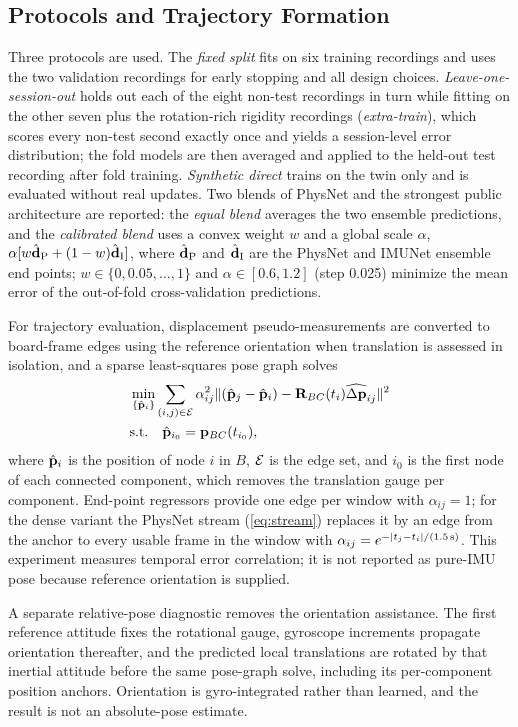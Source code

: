 \subsection{Protocols and Trajectory Formation}
Three protocols are used. The \emph{fixed split} fits on six training
recordings and uses the two validation recordings for early stopping and all
design choices. \emph{Leave-one-session-out} holds out each of the eight
non-test recordings in turn while fitting on the other seven plus the
rotation-rich rigidity recordings (\emph{extra-train}), which scores every
non-test second exactly once and yields a session-level error distribution;
the fold models are then averaged and applied to the held-out test
recording after fold training. \emph{Synthetic direct} trains on the twin only and is evaluated
without real updates. Two blends of PhysNet and the strongest public
architecture are reported: the \emph{equal blend} averages the two ensemble
predictions, and the \emph{calibrated blend} uses a convex weight $w$ and a
global scale $\alpha$, $\alpha[w\hat{\bf d}_{\rm P}+(1-w)\hat{\bf d}_{\rm I}]$,
where $\hat{\bf d}_{\rm P}$ and $\hat{\bf d}_{\rm I}$ are the PhysNet and IMUNet
ensemble end points; $w\in\{0,0.05,\dots,1\}$ and $\alpha\in[0.6,1.2]$ (step
0.025) minimize the mean error of the out-of-fold cross-validation
predictions.

For trajectory evaluation, displacement pseudo-measurements are converted to
board-frame edges using the reference orientation when translation is assessed
in isolation, and a sparse least-squares pose graph solves
\begin{equation}
 \begin{aligned}
 &\min_{\{\hat{\bf p}_i\}}\sum_{(i,j)\in{\cal E}}
 \alpha_{ij}^{2}\|(\hat{\bf p}_j-\hat{\bf p}_i)-{\bf R}_{BC}(t_i)
 \widehat{\Delta{\bf p}}_{ij}\|^2\\
 &\text{s.t.}\quad\hat{\bf p}_{i_0}={\bf p}_{BC}(t_{i_0}),
 \end{aligned}
\end{equation}
where $\hat{\bf p}_i$ is the position of node $i$ in $B$, ${\cal E}$ is the edge
set, and $i_0$ is the first node of each connected component, which removes the
translation gauge per component. End-point regressors provide one edge per
window with $\alpha_{ij}=1$; for the dense variant the PhysNet stream
(\ref{eq:stream}) replaces it by an edge from the anchor to every usable frame
in the window with $\alpha_{ij}=e^{-|t_j-t_i|/(1.5\,{\rm s})}$. This experiment measures temporal
error correlation; it is not reported as pure-IMU pose because reference
orientation is supplied.

A separate relative-pose diagnostic removes the orientation assistance. The
first reference attitude fixes the rotational gauge, gyroscope increments
propagate orientation thereafter, and the predicted local translations are
rotated by that inertial attitude before the same pose-graph solve, including
its per-component position anchors. Orientation is gyro-integrated rather than
learned, and the result is not an absolute-pose estimate.
